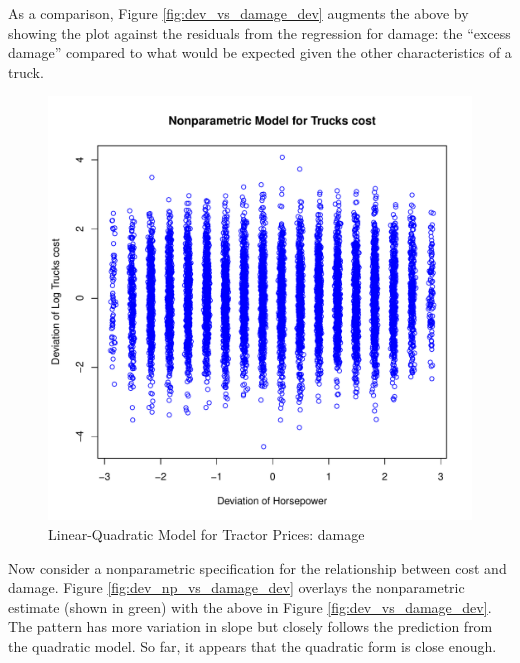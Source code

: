 \documentclass[11pt]{paper}
\begin{document}
\pagebreak
As a comparison, Figure \ref{fig:dev_vs_damage_dev} 
augments the above by showing the plot against the 
residuals from the regression for damage:
the ``excess damage'' compared to what would be 
expected given the other characteristics of a truck. 



\begin{figure}[h!]
  \centering
  \includegraphics[scale = 0.5, keepaspectratio=true]{../Figures/dev_vs_cost_dev}
  \caption{Linear-Quadratic Model for Tractor Prices: damage} \label{fig:dev_vs_cost_dev}
\end{figure}

\clearpage
Now consider a nonparametric specification for 
the relationship between cost and damage.
Figure \ref{fig:dev_np_vs_damage_dev} 
overlays the nonparametric estimate (shown in green) with the above in 
Figure \ref{fig:dev_vs_damage_dev}.
The pattern has more variation in slope but 
closely follows the prediction from the quadratic model. 
So far, it appears that the quadratic form
is close enough.
\end{document}

